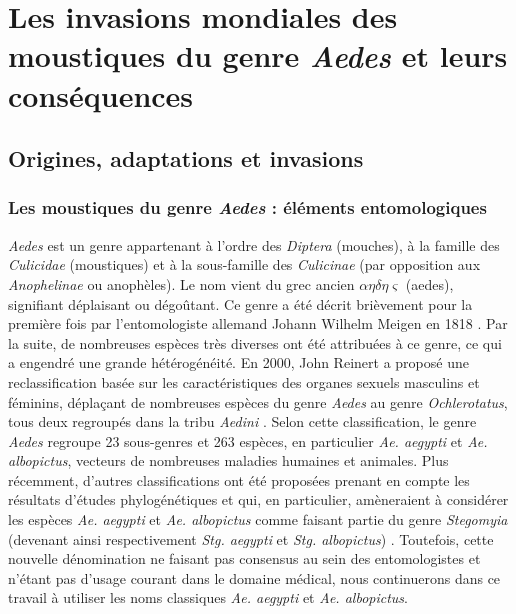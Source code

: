\chapter{Les invasions mondiales des moustiques du genre {\em Aedes} et leurs conséquences}
\chaptermark{}

\section[Origines, adaptations et invasions]{Origines, adaptations et invasions}

\subsection{Les moustiques du genre {\em Aedes} : éléments entomologiques}


{\em Aedes} est un genre appartenant à l'ordre des {\em Diptera} (mouches), à la famille des {\em Culicidae} (moustiques) et à la sous-famille des {\em Culicinae} (par opposition aux {\em Anophelinae} ou anophèles).
Le nom vient du grec ancien  $\alpha \eta \delta \eta \varsigma$ (aedes), signifiant \guillemotleft déplaisant\guillemotright \; ou \guillemotleft dégoûtant\guillemotright.
Ce genre a été décrit brièvement pour la première fois par l'entomologiste allemand Johann Wilhelm Meigen en 1818 \cite{meigen1818}.
Par la suite, de nombreuses espèces très diverses ont été attribuées à ce genre, ce qui a engendré une grande hétérogénéité.
En 2000, John Reinert a proposé une reclassification basée sur les caractéristiques des organes sexuels masculins et féminins, déplaçant de nombreuses espèces du genre {\em Aedes} au genre {\em Ochlerotatus}, tous deux regroupés dans la tribu {\em Aedini} \cite{reinert2000new}.
Selon cette classification, le genre {\em Aedes} regroupe 23 sous-genres et 263 espèces, en particulier {\em Ae. aegypti} et {\em Ae. albopictus}, vecteurs de nombreuses maladies humaines et animales. 
Plus récemment, d'autres classifications ont été proposées prenant en compte les résultats d'études phylogénétiques et qui, en particulier, amèneraient à considérer les espèces {\em Ae. aegypti} et {\em Ae. albopictus} comme faisant partie du genre {\em Stegomyia} (devenant ainsi respectivement {\em Stg. aegypti} et {\em Stg. albopictus}) \cite{reinert2004phylogeny}.
Toutefois, cette nouvelle dénomination ne faisant pas consensus au sein des entomologistes \cite{polaszek2006two} et n'étant pas d'usage courant dans le domaine médical, nous continuerons dans ce travail à utiliser les noms classiques {\em Ae. aegypti} et {\em Ae. albopictus}.


